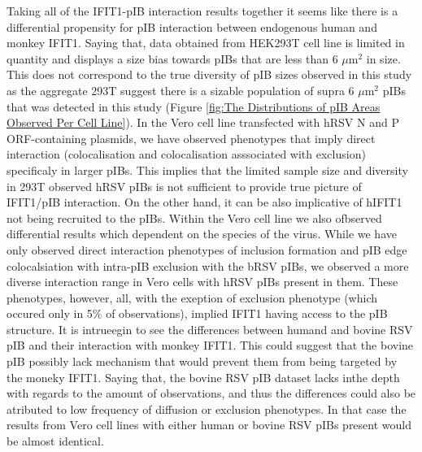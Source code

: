 Taking all of the IFIT1-pIB interaction results together it seems like there is a differential propensity for pIB interaction between endogenous human and monkey IFIT1. Saying that, data obtained from HEK293T cell line is limited in quantity and displays a size bias towards pIBs that are less than 6 \(\mu \mbox{m}^2\) in size. This does not correspond to the true diversity of pIB sizes observed in this study as the aggregate 293T suggest there is a sizable population of supra 6 \(\mu \mbox{m}^2\) pIBs that was detected in this study (Figure \ref{fig:The Distributions of pIB Areas Observed Per Cell Line}). In the Vero cell line transfected with hRSV N and P ORF-containing plasmids, we have observed phenotypes that imply direct interaction (colocalisation and colocalisation asssociated with exclusion) specificaly in larger pIBs. This implies that the limited sample size and diversity in 293T observed hRSV pIBs is not sufficient to provide true picture of IFIT1/pIB interaction. On the other hand, it can be also implicative of hIFIT1 not being recruited to the pIBs. Within the Vero cell line we also ofbserved differential results which dependent on the species of the virus. While we have only observed direct interaction phenotypes of inclusion formation and pIB edge colocalsiation with intra-pIB exclusion with the bRSV pIBs, we observed a more diverse interaction range in Vero cells with hRSV pIBs present in them. These phenotypes, however, all, with the exeption of exclusion phenotype (which occured only in 5\% of observations), implied IFIT1 having access to the pIB structure. It is intrueegin to see the differences between humand and bovine RSV pIB and their interaction with monkey IFIT1. This could suggest that the bovine pIB possibly lack mechanism that would prevent them from being targeted by the moneky IFIT1. Saying that, the bovine RSV pIB dataset lacks inthe depth with regards to the amount of observations, and thus the differences could also be atributed to low frequency of diffusion or exclusion phenotypes. In that case the results from Vero cell lines with either human or bovine RSV pIBs present would be almost identical.

